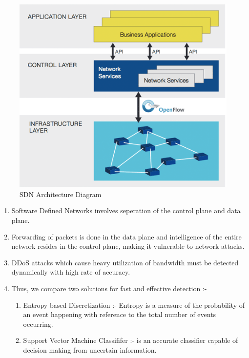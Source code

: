 \documentclass[12pt,a4paper,final]{article}
\begin{document}
\begin{flushleft}
\begin{figure}[H]
\begin{center}
\includegraphics[scale=0.5]{SdnArchitecture-2.png}
\caption{SDN Architecture Diagram}
\end{center}
\end{figure}
\begin{enumerate}
\item
Software Defined Networks involves seperation of the control plane and data plane.

\item
Forwarding of packets is done in the data plane and
intelligence of the entire network resides in the control plane, making it vulnerable to network attacks.

\item
DDoS attacks which cause heavy utilization of bandwidth must be detected dynamically with high rate of accuracy.

\item
Thus, we compare two solutions for fast and effective detection :- 
\begin{enumerate}
\item
Entropy based Discretization :- Entropy is a measure of the probability of an event happening with reference to the total number of events occurring.

\item
Support Vector Machine Classififer :- is an accurate classifier capable of decision making from uncertain information.
\end{enumerate}


\end{enumerate}
\end{flushleft}
\end{document}
